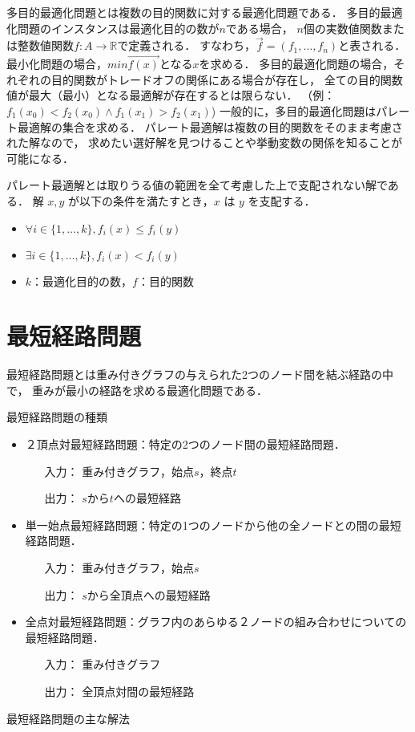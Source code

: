 \documentclass[12pt]{optlab-bachelor}
\begin{document}
多目的最適化問題とは複数の目的関数に対する最適化問題である．
多目的最適化問題のインスタンスは最適化目的の数が$n$である場合，
$n$個の実数値関数または整数値関数$f : A \rightarrow \mathbb{R}$で定義される．
すなわち，$\vec{f} = (f_1 , \ldots , f_n)$と表される．
最小化問題の場合，$min\vec{f(x)}$となる$x$を求める．
多目的最適化問題の場合，それぞれの目的関数がトレードオフの関係にある場合が存在し，
全ての目的関数値が最大（最小）となる最適解が存在するとは限らない．
（例：$f_1(x_0) < f_2(x_0) \land f_1(x_1) > f_2(x_1)$)
一般的に，多目的最適化問題はパレート最適解の集合を求める．
パレート最適解は複数の目的関数をそのまま考慮された解なので，
求めたい選好解を見つけることや挙動変数の関係を知ることが可能になる．

パレート最適解とは取りうる値の範囲を全て考慮した上で支配されない解である．
解 $x,y$ が以下の条件を満たすとき，$x$ は $y$ を支配する．
\begin{itemize}
\item $\forall i \in \{1,\ldots,k\},f_i(x) \le f_i(y)$
\item $\exists i \in \{1,\ldots,k\},f_i(x) < f_i(y)$
\item $k$：最適化目的の数，$f$：目的関数
\end{itemize}

\section{最短経路問題}
最短経路問題とは重み付きグラフの与えられた2つのノード間を結ぶ経路の中で，
重みが最小の経路を求める最適化問題である．
\begin{description}
  \item[最短経路問題の種類]
\end{description}
\begin{itemize}
\item ２頂点対最短経路問題：特定の2つのノード間の最短経路問題．
\begin{itemize}
  \item[入力：]重み付きグラフ，始点$s$，終点$t$
  \item[出力：]$s$から$t$への最短経路
\end{itemize}
\item 単一始点最短経路問題：特定の1つのノードから他の全ノードとの間の最短経路問題．
\begin{itemize}
  \item[入力：]重み付きグラフ，始点$s$
  \item[出力：]$s$から全頂点への最短経路
\end{itemize}
\item 全点対最短経路問題：グラフ内のあらゆる２ノードの組み合わせについての最短経路問題．
\begin{itemize}
  \item[入力：]重み付きグラフ
  \item[出力：]全頂点対間の最短経路
\end{itemize}
\end{itemize}
\begin{description}
  \item[最短経路問題の主な解法]
\end{description}
\end{document}
